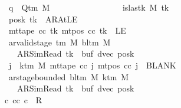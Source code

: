 \begin{isabellebody}
\ \ \ \ \ \ \ \ \ \ \ \ \ \ \ \ \ q\ {\isasymin}\ Q{\isacharunderscore}{\kern0pt}tm\ M{\isacharsemicolon}{\kern0pt}\isanewline
\ \ \ \ \ \ \ \ \ \ \ \ \ \ \ \ \ is{\isacharunderscore}{\kern0pt}last{\isacharunderscore}{\kern0pt}k\ M\ tk{\isacharsemicolon}{\kern0pt}\isanewline
\ \ \ \ \ \ \ \ \ \ \ \ \ \ \ \ \ posk\ tk\ {\isacharequal}{\kern0pt}\ AR{\isacharunderscore}{\kern0pt}AtLE{\isacharsemicolon}{\kern0pt}\isanewline
\ \ \ \ \ \ \ \ \ \ \ \ \ \ \ \ \ mt{\isacharunderscore}{\kern0pt}tape\ cc\ tk\ {\isacharparenleft}{\kern0pt}mt{\isacharunderscore}{\kern0pt}pos\ cc\ tk{\isacharparenright}{\kern0pt}\ {\isacharequal}{\kern0pt}\ LE{}{\isacharsemicolon}{\kern0pt}\isanewline
\ \ \ \ \ \ \ \ \ \ \ \ \ \ \ \ \ ar{\isacharunderscore}{\kern0pt}valid{\isacharunderscore}{\kern0pt}stage\ {\isacharparenleft}{\kern0pt}{\isasymGamma}{\isacharunderscore}{\kern0pt}tm\ M{\isacharparenright}{\kern0pt}\ {\isacharparenleft}{\kern0pt}bl{\isacharunderscore}{\kern0pt}tm\ M{\isacharparenright}{\kern0pt}\isanewline
\ \ \ \ \ \ \ \ \ \ \ \ \ \ \ \ \ \ \ {\isacharparenleft}{\kern0pt}AR{\isacharunderscore}{\kern0pt}SimRead{\isacharcomma}{\kern0pt}\ tk{\isacharcomma}{\kern0pt}\ {}{\isacharcomma}{\kern0pt}\ buf{\isacharcomma}{\kern0pt}\ dvec{\isacharcomma}{\kern0pt}\ posk{\isacharparenright}{\kern0pt}{\isacharsemicolon}{\kern0pt}\isanewline
\ \ \ \ \ \ \ \ \ \ \ \ \ \ \ \ \ {\isasymforall}j\ {\isasymge}\ k{\isacharunderscore}{\kern0pt}tm\ M{\isachardot}{\kern0pt}\ mt{\isacharunderscore}{\kern0pt}tape\ cc\ j\ {\isacharparenleft}{\kern0pt}mt{\isacharunderscore}{\kern0pt}pos\ cc\ j{\isacharparenright}{\kern0pt}\ {\isacharequal}{\kern0pt}\ BLANK{}{\isacharsemicolon}{\kern0pt}\isanewline
\ \ \ \ \ \ \ \ \ \ \ \ \ \ \ \ \ ar{\isacharunderscore}{\kern0pt}stage{\isacharunderscore}{\kern0pt}bounded\ {\isacharparenleft}{\kern0pt}bl{\isacharunderscore}{\kern0pt}tm\ M{\isacharparenright}{\kern0pt}\ {\isacharparenleft}{\kern0pt}k{\isacharunderscore}{\kern0pt}tm\ M{\isacharparenright}{\kern0pt}\isanewline
\ \ \ \ \ \ \ \ \ \ \ \ \ \ \ \ \ \ \ {\isacharparenleft}{\kern0pt}AR{\isacharunderscore}{\kern0pt}SimRead{\isacharcomma}{\kern0pt}\ tk{\isacharcomma}{\kern0pt}\ {}{\isacharcomma}{\kern0pt}\ buf{\isacharcomma}{\kern0pt}\ dvec{\isacharcomma}{\kern0pt}\ posk{\isacharparenright}{\kern0pt}\ {\isasymrbrakk}\isanewline
\ \ \ \ \ \ \ \ \ \ \ \ \ \ \ {\isasymLongrightarrow}\ {\isasymexists}c{\isacharprime}{\kern0pt}{\isacharprime}{\kern0pt}{\isachardot}{\kern0pt}\ {\isacharparenleft}{\kern0pt}cc{\isacharcomma}{\kern0pt}\ c{\isacharprime}{\kern0pt}{\isacharprime}{\kern0pt}{\isacharparenright}{\kern0pt}\ {\isasymin}\ R{\isacharprime}{\kern0pt}\isanewline

\end{isabellebody}
